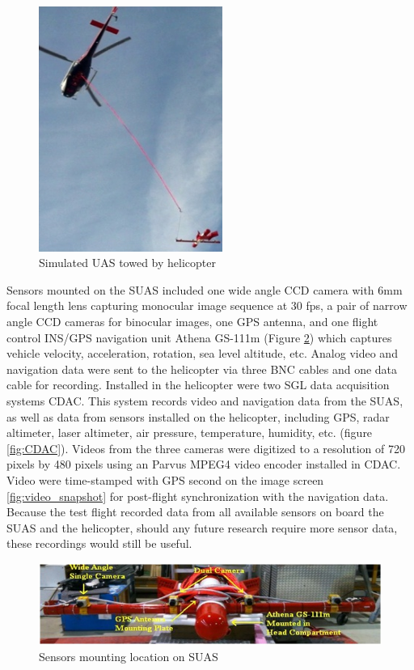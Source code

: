 \begin{figure}[h]
\includegraphics[width=6cm,keepaspectratio=true]{./Figures/towed_SUAS.jpg}
\caption{Simulated UAS towed by helicopter}
\label{fig:towedSUAS}
\end{figure}
\FloatBarrier

Sensors mounted on the SUAS included one wide angle CCD camera with
6mm focal length lens capturing monocular image sequence at 30 fps, a
pair of narrow angle CCD cameras for binocular images, one GPS
antenna, and one flight control INS/GPS navigation unit Athena GS-111m
\cite{_athena_????} (Figure \ref{fig:SUAS}) which captures vehicle
velocity, acceleration, rotation, sea level altitude, etc. Analog
video and navigation data were sent to the helicopter via three BNC
cables and one data cable for recording. Installed in the helicopter
were two SGL data acquisition systems CDAC. This system records video
and navigation data from the SUAS, as well as data from sensors
installed on the helicopter, including GPS, radar altimeter, laser
altimeter, air pressure, temperature, humidity, etc. (figure
\ref{fig:CDAC}). Videos from the three cameras were digitized to a
resolution of 720 pixels by 480 pixels using an Parvus MPEG4 video
encoder installed in CDAC. Video were time-stamped with GPS second on
the image screen \ref{fig:video_snapshot} for post-flight
synchronization with the navigation data. Because the test flight
recorded data from all available sensors on board the SUAS and the
helicopter, should any future research require more sensor data, these
recordings would still be useful.

\begin{figure}[h]
  \centering
  \includegraphics[width=14cm,keepaspectratio=true]{./Figures/SUAS.jpg}
  \caption{Sensors mounting location on SUAS}
  \label{fig:SUAS}
\end{figure}

